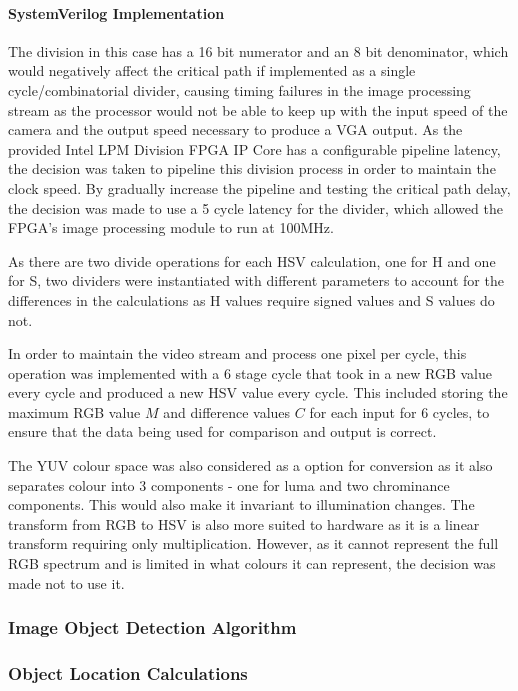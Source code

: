 \documentclass[a4paper]{article}
\begin{document}
\paragraph*{SystemVerilog Implementation}
The division in this case has a 16 bit numerator and an 8 bit denominator, which
would negatively affect the critical path if implemented as a single cycle/combinatorial
divider, causing timing failures in the image processing stream as the processor 
would not be able to keep up with the input speed of the camera and the
output speed necessary to produce a VGA output. As the provided Intel LPM Division FPGA 
IP Core has a configurable pipeline latency, the decision was taken to pipeline this division
process in order to maintain the clock speed. By gradually increase the pipeline 
and testing the critical path delay, the decision was made to use a 5 cycle latency
for the divider, which allowed the FPGA's image processing module to run at 100MHz. 

As there are two divide operations for each HSV calculation, one for H and one for S,
two dividers were instantiated with different parameters to account for the differences 
in the calculations as H values require signed values and S values do not. 

In order to maintain the video stream and process one pixel per cycle, this operation 
was implemented with a 6 stage cycle that took in a new RGB value every cycle and
produced a new HSV value every cycle. This included storing the maximum RGB value \( M \) and difference
values \(C \) for each input for 6 cycles, to ensure that the data being used for 
comparison and output is correct. 


The YUV colour space was also considered as a option for conversion as it also
separates colour into 3 components - one for luma and two chrominance components.
This would also make it invariant to illumination changes. The transform from RGB
to HSV is also more suited to hardware as it is a linear transform requiring only
multiplication. However, as it cannot represent the full RGB spectrum and is 
limited in what colours it can represent, the decision was made not to use it.    


\subsubsection{Image Object Detection Algorithm}


\subsubsection{Object Location Calculations}
\end{document}
